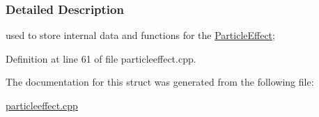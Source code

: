 \subsubsection{Detailed Description}
used to store internal data and functions for the \hyperlink{classphys_1_1ParticleEffect}{ParticleEffect}; 

Definition at line 61 of file particleeffect.cpp.



The documentation for this struct was generated from the following file:\begin{DoxyCompactItemize}
\item 
\hyperlink{particleeffect_8cpp}{particleeffect.cpp}\end{DoxyCompactItemize}
